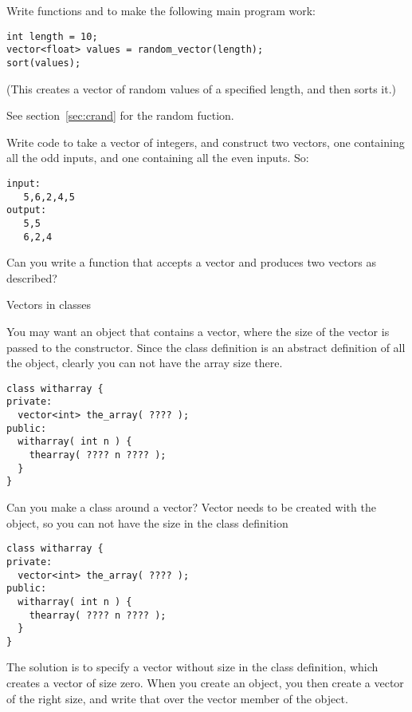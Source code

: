 \begin{exercise}
  \label{ex:vec-rand-sort}
  Write functions  and  to make the following
  main program work:
\begin{lstlisting}
int length = 10;
vector<float> values = random_vector(length);
sort(values);
\end{lstlisting}
  (This creates a vector of random values of a specified length, and
then sorts it.)

See section~\ref{sec:crand} for the random fuction.
\end{exercise}

\begin{exercise}
  \label{ex:splitoddeven}
  Write code to take a vector of integers, and construct two
  vectors, one containing all the odd inputs, and one containing all
  the even inputs. So:
\begin{lstlisting}
input:
   5,6,2,4,5
output:
   5,5
   6,2,4
\end{lstlisting}
  Can you write a function that accepts a vector and produces two
  vectors as described?
\end{exercise}

 {Vectors in classes}

You may want an object that contains a vector, where the size of the
vector is passed to the constructor. Since the class definition is an
abstract definition of all the object, clearly you can not have the
array size there.

\begin{lstlisting}
class witharray {
private:
  vector<int> the_array( ???? );
public:
  witharray( int n ) {
    thearray( ???? n ???? );
  }
}
\end{lstlisting}

\begin{slide}{Can you make a class around a vector?}
  \label{sl:class-with-vector}
  Vector needs to be created with the object, so you can not have the
  size in the class definition
\begin{lstlisting}
class witharray {
private:
  vector<int> the_array( ???? );
public:
  witharray( int n ) {
    thearray( ???? n ???? );
  }
}
\end{lstlisting}
\end{slide}

The solution is to specify a vector without size in the class
definition, which creates a vector of size zero. When you create an
object, you then create a vector of the right size, and write that
over the vector member of the object.

